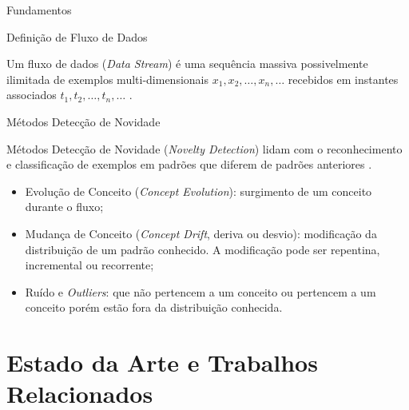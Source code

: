 \documentclass[aspectratio=1610,10pt]{beamer}
\begin{document}
\begin{frame}[fragile]{Fundamentos}
  \begin{block}{Definição de Fluxo de Dados}
    
    \vspace{1mm}

    Um fluxo de dados (\textit{Data Stream}) é uma sequência massiva possivelmente
    ilimitada de exemplos multi-dimensionais $x_1, x_2, \dots, x_n, \dots$
    recebidos em instantes associados $t_1, t_2, \dots, t_n, \dots$
    \cite{Aggarwal2003}.
  \end{block}

  \pause
  \begin{alertblock}{Métodos Detecção de Novidade}
    
    \vspace{1mm}
    Métodos Detecção de Novidade (\emph{Novelty Detection}) lidam com o reconhecimento e
    classificação de exemplos em padrões que diferem de padrões anteriores
    \cite{Gama2010}.
    \begin{itemize}%
      
      \item Evolução de Conceito (\emph{Concept Evolution}): surgimento de um conceito durante
      o fluxo;
      
      \item Mudança de Conceito (\emph{Concept Drift}, deriva ou desvio): modificação da
      distribuição de um padrão conhecido. A modificação pode ser repentina,
      incremental ou recorrente;
      
      \item Ruído e \emph{Outliers}: que não pertencem a um conceito ou
      pertencem a um conceito porém estão fora da distribuição conhecida.
      
    \end{itemize}
  \end{alertblock}
\end{frame}


\section{Estado da Arte e Trabalhos Relacionados}

\newcommand{\arch}{IDSA-IoT\xspace}
\end{document}
